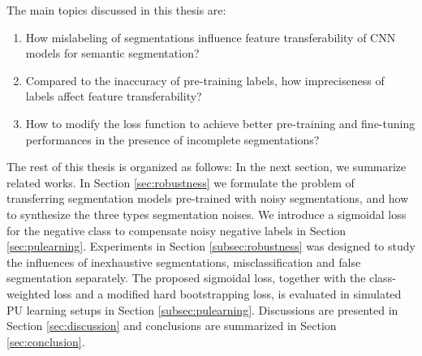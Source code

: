 
The main topics discussed in this thesis are:
\begin{enumerate}
  \item How mislabeling of segmentations influence feature transferability of CNN models for semantic segmentation?
  \item Compared to the inaccuracy of pre-training labels, how impreciseness of labels affect feature transferability?
  \item How to modify the loss function to achieve better pre-training and fine-tuning performances in the presence of incomplete segmentations?
\end{enumerate}


The rest of this thesis is organized as follows:
In the next section, we summarize related works.
In Section \ref{sec:robustness} we formulate the problem of transferring segmentation models pre-trained with noisy segmentations, and how to synthesize the three types segmentation noises.
We introduce a sigmoidal loss for the negative class to compensate noisy negative labels in Section \ref{sec:pulearning}.
Experiments in Section \ref{subsec:robustness} was designed to study the influences of inexhaustive segmentations, misclassification and false segmentation separately.
The proposed sigmoidal loss, together with the class-weighted loss and a modified hard bootstrapping loss, is evaluated in simulated PU learning setups in Section \ref{subsec:pulearning}.
Discussions are presented in Section \ref{sec:discussion} and conclusions are summarized in Section \ref{sec:conclusion}.

